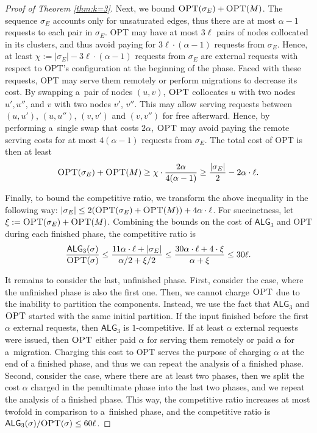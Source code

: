 \documentclass[a4paper,anonymous,USenglish]{lipics-v2019}
\newcommand{\OPT}{\textsc{OPT}\xspace}
\newcommand{\TAlg}{{\ensuremath{\textsf{ALG}_{3}}}\xspace}
\begin{document}
\begin{proof}[Proof of Theorem \ref{thm:k=3}]
	Next, we bound $\OPT(\sigma_E) + \OPT(M)$.
	The sequence $\sigma_E$ accounts only for unsaturated edges, thus there are at most $\alpha-1$ requests to each pair in $\sigma_E$.
	\OPT may have at most $3\ell$ pairs of nodes collocated in its clusters, and thus avoid paying for $3\ell\cdot(\alpha-1)$ requests from $\sigma_E$.
	Hence, at least $\chi := |\sigma_E| - 3\ell\cdot(\alpha-1)$ requests from $\sigma_E$ are external requests with respect to \OPT's configuration at the beginning of the phase.
	Faced with these requests, \OPT may serve them remotely or perform migrations to decrease its cost.
	By swapping a~pair of nodes $(u,v)$, $\OPT$ collocates $u$ with two nodes $u', u''$, and $v$ with two nodes $v'$, $v''$.
	This may allow serving requests between $(u,u')$, $(u,u'')$, $(v,v')$ and $(v,v'')$ for free afterward.
	Hence, by performing a~single swap that costs $2\alpha$, $\OPT$ may avoid paying the remote serving costs for at most $4 (\alpha - 1)$ requests from $\sigma_E$.
	The total cost of \OPT is then at least
	\[
		\OPT(\sigma_E) + \OPT(M) \geq \chi \cdot \frac{2\alpha}{4 (\alpha-1)}\geq \frac{|\sigma_E|} {2} - 2 \alpha \cdot \ell.
	\]
	
	Finally, to bound the competitive ratio, we transform the above inequality in the following way: $|\sigma_E| \leq 2(\OPT(\sigma_E)+\OPT(M)) + 4\alpha \cdot \ell$.
	For succinctness, let $\xi := \OPT(\sigma_E) + \OPT(M)$.
	Combining the bounds on the cost of \TAlg and \OPT during each finished phase, the competitive ratio is
%
	\[
		\frac{\TAlg(\sigma)}{\OPT(\sigma)} \leq \frac{11\alpha \cdot \ell + |\sigma_E|}{\alpha/2 + \xi/2} \leq \frac{30\alpha\cdot\ell + 4\cdot \xi}{\alpha + \xi} \leq 30 \ell.
	\]
%	
	\medskip
	
	It remains to consider the last, unfinished phase.
	First, consider the case, where the unfinished phase is also the first one.
	Then, we cannot charge $\OPT$ due to the inability to partition the components.
	Instead, we use the fact that \TAlg and $\OPT$ started with the same initial partition.
	If the input finished before the first $\alpha$ external requests, then \TAlg is $1$-competitive.
	If at least $\alpha$ external requests were issued, then $\OPT$ either paid $\alpha$ for serving them remotely or paid $\alpha$ for a~migration.
	Charging this cost to \OPT serves the purpose of charging $\alpha$ at the end of a finished phase, and thus we can repeat the analysis of a finished phase.
	Second, consider the case, where there are at least two phases, then we split the cost $\alpha$ charged in the penultimate phase into the last two phases, and we repeat the analysis of a finished phase.
	This way, the competitive ratio increases at most twofold in comparison to a~finished phase, and the competitive ratio is $\TAlg(\sigma)/\OPT(\sigma) \leq 60\ell$.
\end{proof}
\end{document}
